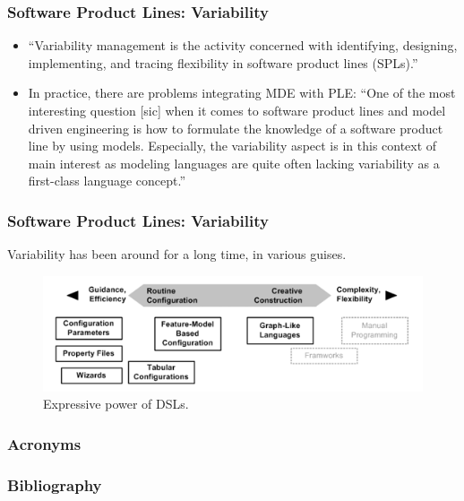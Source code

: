 \documentclass{beamer}
\begin{document}
\begin{frame}
\frametitle{Software Product Lines: Variability}

\begin{itemize}

\item ``Variability management is the activity concerned with
  identifying, designing, implementing, and tracing flexibility in
  software product lines (SPLs).''

\pause

\item In practice, there are problems integrating \ac{MDE} with
  \ac{PLE}: ``One of the most interesting question [sic] when it comes
  to software product lines and model driven engineering is how to
  formulate the knowledge of a software product line by using
  models. Especially, the variability aspect is in this context of
  main interest as modeling languages are quite often lacking
  variability as a first-class language
  concept.''\cite{brambilla2012model}

\end{itemize}

\end{frame}

\begin{frame}
\frametitle{Software Product Lines: Variability}

Variability has been around for a long time, in various guises.

\begin{figure}
  \centering
  \includegraphics[scale=0.6]{images/variability_spectrum_voelter.png}
  \caption{Expressive power of \ac{DSL}s.\cite{groher2007expressing}}
\end{figure}

\end{frame}

\begin{frame}
\frametitle{Acronyms}

\begin{acronym}
\end{acronym}

\end{frame}

\begin{frame}
\frametitle{Bibliography}

\printbibliography

\end{frame}
\end{document}
